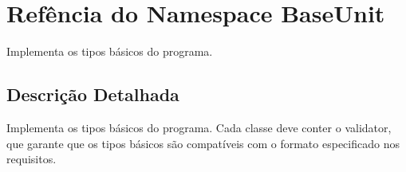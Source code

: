 \hypertarget{namespaceBaseUnit}{\section{Refência do Namespace Base\-Unit}
\label{namespaceBaseUnit}
}


Implementa os tipos básicos do programa.  




\subsection{Descrição Detalhada}
Implementa os tipos básicos do programa. Cada classe deve conter o validator, que garante que os tipos básicos são compatíveis com o formato especificado nos requisitos. 